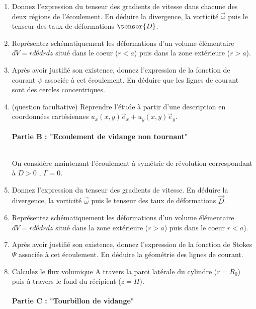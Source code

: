 \begin{enumerate}

\item Donnez l'expression du tenseur des gradients de vitesse dans chacune des deux régions de l'écoulement. En déduire la divergence, la vorticité $\vec \omega$ puis le tenseur des taux de déformations $\tensor{D}$.

\item 
Représentez schématiquement les déformations d'un volume élémentaire $dV = r d\theta dr dz$ situé dans le coeur ($r<a$) puis dans la zone extérieure ($r>a$).

\item Après avoir justifié son existence, donnez l'expression de la fonction de courant $\psi$ associée à cet écoulement. En déduire que les lignes de courant sont des cercles concentriques.

\item (question facultative) Reprendre l'étude à partir d'une description en coordonnées cartésiennes $u_x(x,y) \vec e_x  + u_y(x,y)  \vec e_y $. 

\paragraph{Partie B :  "Ecoulement de vidange non tournant" }  $ \, $

On considère maintenant l'écoulement à symétrie de révolution correspondant à $D > 0$ , $\Gamma = 0$.


\item Donnez l'expression du tenseur des gradients de vitesse. En déduire la divergence, la vorticité $\vec \omega$ puis le tenseur des taux de déformations $\vec{D}$.

\item 
Représentez schématiquement les déformations d'un volume élémentaire $dV = r d\theta dr dz$ situé dans la zone extérieure ($r>a$) puis dans le coeur $r<a$).

\item Après avoir justifié son existence, donnez l'expression de la fonction de Stokes $\Psi$ associée à cet écoulement. En déduire la géométrie des lignes de courant.

\item Calculez le flux volumique A travers la paroi latérale du cylindre ($r=R_0$) puis à travers le fond du récipient ($z=H$).


\paragraph{Partie C :  "Tourbillon de vidange" }  $ \, $


\end{enumerate}
